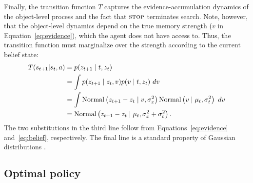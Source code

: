 Finally, the transition function $T$ captures the evidence-accumulation dynamics of the object-level process and the fact that $\textsc{stop}$ terminates search. Note, however, that the object-level dynamics depend on the true memory strength ($v$ in Equation~\ref{eq:evidence}), which the agent does not have access to. Thus, the transition function must marginalize over the strength according to the current belief state:
%
\begin{equation}\label{eq:transition}
\begin{aligned}
  T(s_{t+1} | s_t, a) 
  &= p(z_{t+1} \mid t, z_t) \\
  &= \int p(z_{t+1} \mid z_t, v) p(v \mid t, z_t) \ dv \\
  &= \int \mathrm{Normal}\left( z_{t+1} - z_t \mid v, \sigma_x^2 \right) 
          \mathrm{Normal}\left( v \mid \mu_t, \sigma_t^2 \right)\ dv \\
  &= \mathrm{Normal}\left( z_{t+1} - z_t \mid \mu_t, \sigma_x^2 + \sigma_t^2 \right).
\end{aligned}
\end{equation}
%
The two substitutions in the third line follow from Equations~\ref{eq:evidence} and~\ref{eq:belief}, respectively. The final line is a standard property of Gaussian distributions \citep{murphy2007conjugate}.


\subsection{Optimal policy}

